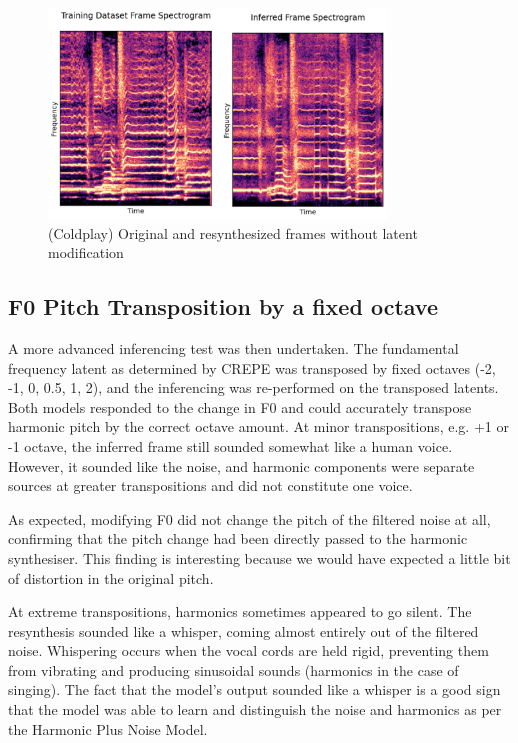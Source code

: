\begin{figure}[H]
    \centering
    \includegraphics[width=0.8\textwidth]{research/results/Coldplay/InferredRecreation.png}
    \caption{(Coldplay) Original and resynthesized frames without latent modification}
\end{figure}

\subsection{F0 Pitch Transposition by a fixed octave}

A more advanced inferencing test was then undertaken. The fundamental frequency latent as determined by CREPE was transposed by fixed octaves (-2, -1, 0, 0.5, 1, 2), and the inferencing was re-performed on the transposed latents. Both models responded to the change in F0 and could accurately transpose harmonic pitch by the correct octave amount. At minor transpositions, e.g. +1 or -1 octave, the inferred frame still sounded somewhat like a human voice. However, it sounded like the noise, and harmonic components were separate sources at greater transpositions and did not constitute one voice.

As expected, modifying F0 did not change the pitch of the filtered noise at all, confirming that the pitch change had been directly passed to the harmonic synthesiser. This finding is interesting because we would have expected a little bit of distortion in the original pitch.

At extreme transpositions, harmonics sometimes appeared to go silent. The resynthesis sounded like a whisper, coming almost entirely out of the filtered noise. Whispering occurs when the vocal cords are held rigid, preventing them from vibrating and producing sinusoidal sounds (harmonics in the case of singing). The fact that the model's output sounded like a whisper is a good sign that the model was able to learn and distinguish the noise and harmonics as per the Harmonic Plus Noise Model\cite{HarmonicPlusNoise}\cite{OriginalDDSP}.

